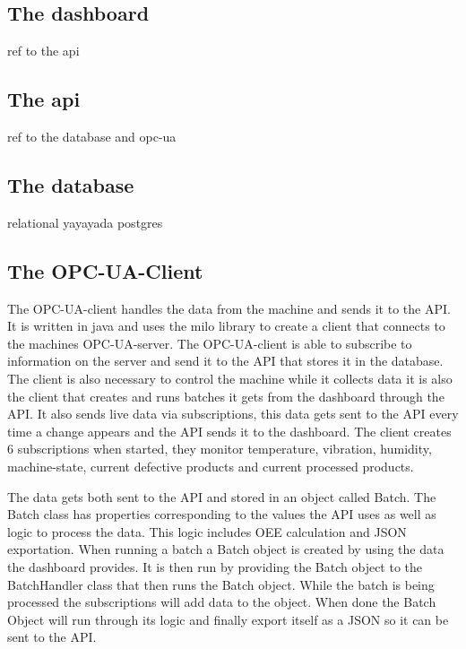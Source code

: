 \subsection{The dashboard}
ref to the api

\subsection{The api}
ref to the database and opc-ua

\subsection{The database}
relational yayayada postgres


\subsection{The OPC-UA-Client}
The OPC-UA-client handles the data from the machine and sends it to the API. It 
is written in java and uses the milo library to create a client that connects to 
the machines OPC-UA-server. The OPC-UA-client is able to subscribe to 
information on the server and send it to the API that stores it in the database. 
The client is also necessary to control the machine while it collects data it is 
also the client that creates and runs batches it gets from the dashboard through 
the API. It also sends live data via subscriptions, this data gets sent to the 
API every time a change appears and the API sends it to the dashboard. The 
client creates 6 subscriptions when started, they monitor temperature, 
vibration, humidity, machine-state,  current defective products and current 
processed products. 

The data gets both sent to the API and stored in an object called 
Batch. The Batch class  has properties 
corresponding to the values the API uses as well as logic to process the data. 
This logic includes OEE calculation and JSON exportation. When running a batch a 
Batch object is created by using the data the dashboard provides. It is then run 
by providing the Batch object to the BatchHandler class that then runs the Batch 
object. While the batch is being processed the subscriptions will add data to 
the object. When done the Batch Object will run through its logic and finally 
export itself as a JSON so it can be sent to the API. 